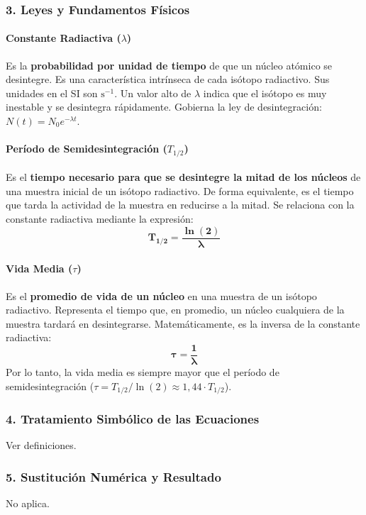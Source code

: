 \subsubsection*{3. Leyes y Fundamentos Físicos}
\begin{cajaconclusion}
\paragraph*{Constante Radiactiva ($\lambda$)}
Es la \textbf{probabilidad por unidad de tiempo} de que un núcleo atómico se desintegre. Es una característica intrínseca de cada isótopo radiactivo. Sus unidades en el SI son $\text{s}^{-1}$. Un valor alto de $\lambda$ indica que el isótopo es muy inestable y se desintegra rápidamente. Gobierna la ley de desintegración: $N(t) = N_0 e^{-\lambda t}$.

\paragraph*{Período de Semidesintegración ($T_{1/2}$)}
Es el \textbf{tiempo necesario para que se desintegre la mitad de los núcleos} de una muestra inicial de un isótopo radiactivo. De forma equivalente, es el tiempo que tarda la actividad de la muestra en reducirse a la mitad. Se relaciona con la constante radiactiva mediante la expresión:
$$ \boldsymbol{T_{1/2} = \frac{\ln(2)}{\lambda}} $$

\paragraph*{Vida Media ($\tau$)}
Es el \textbf{promedio de vida de un núcleo} en una muestra de un isótopo radiactivo. Representa el tiempo que, en promedio, un núcleo cualquiera de la muestra tardará en desintegrarse. Matemáticamente, es la inversa de la constante radiactiva:
$$ \boldsymbol{\tau = \frac{1}{\lambda}} $$
Por lo tanto, la vida media es siempre mayor que el período de semidesintegración ($\tau = T_{1/2} / \ln(2) \approx 1,44 \cdot T_{1/2}$).
\end{cajaconclusion}

\subsubsection*{4. Tratamiento Simbólico de las Ecuaciones}
Ver definiciones.
\subsubsection*{5. Sustitución Numérica y Resultado}
No aplica.
